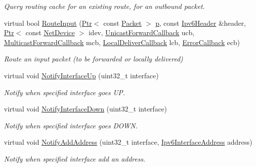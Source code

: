 \begin{DoxyCompactItemize}
\begin{DoxyCompactList}\small\item\em Query routing cache for an existing route, for an outbound packet. \end{DoxyCompactList}\item 
virtual bool \hyperlink{classns3_1_1Ipv6ListRouting_a1b4d7867aad1029308cb7907f75e1035}{Route\+Input} (\hyperlink{classns3_1_1Ptr}{Ptr}$<$ const \hyperlink{classns3_1_1Packet}{Packet} $>$ \hyperlink{lte__link__budget__x2__handover__measures_8m_ac9de518908a968428863f829398a4e62}{p}, const \hyperlink{classns3_1_1Ipv6Header}{Ipv6\+Header} \&header, \hyperlink{classns3_1_1Ptr}{Ptr}$<$ const \hyperlink{classns3_1_1NetDevice}{Net\+Device} $>$ idev, \hyperlink{classns3_1_1Ipv6RoutingProtocol_a579fd6755ee873009819f7117371fea7}{Unicast\+Forward\+Callback} ucb, \hyperlink{classns3_1_1Ipv6RoutingProtocol_a5f12e04512ce8e5808c3cceff6b8918f}{Multicast\+Forward\+Callback} mcb, \hyperlink{classns3_1_1Ipv6RoutingProtocol_a93f6c06be1e024747e95f4299eba74a6}{Local\+Deliver\+Callback} lcb, \hyperlink{classns3_1_1Ipv6RoutingProtocol_abfdf43594e2ae97e1a4dc340e3a086a5}{Error\+Callback} ecb)
\begin{DoxyCompactList}\small\item\em Route an input packet (to be forwarded or locally delivered) \end{DoxyCompactList}\item 
virtual void \hyperlink{classns3_1_1Ipv6ListRouting_afbeeaf6cd4dd9a81354e70617bf88811}{Notify\+Interface\+Up} (uint32\+\_\+t interface)
\begin{DoxyCompactList}\small\item\em Notify when specified interface goes UP. \end{DoxyCompactList}\item 
virtual void \hyperlink{classns3_1_1Ipv6ListRouting_a24b3d4068e036c349699901558f0471c}{Notify\+Interface\+Down} (uint32\+\_\+t interface)
\begin{DoxyCompactList}\small\item\em Notify when specified interface goes D\+O\+WN. \end{DoxyCompactList}\item 
virtual void \hyperlink{classns3_1_1Ipv6ListRouting_a67d4f8e48b55a0c99d8e59ac5b74c498}{Notify\+Add\+Address} (uint32\+\_\+t interface, \hyperlink{classns3_1_1Ipv6InterfaceAddress}{Ipv6\+Interface\+Address} address)
\begin{DoxyCompactList}\small\item\em Notify when specified interface add an address. \end{DoxyCompactList}\item 

\end{DoxyCompactItemize}
